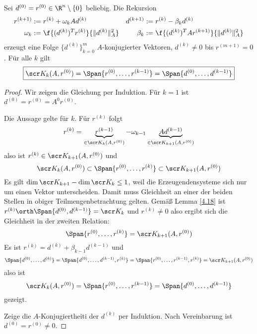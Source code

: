 \documentclass[11pt]{scrbook}
\begin{document}
\begin{st} \label{4.20}
	Sei $d^{(0)} = r^{(0)} \in \R^n \setminus \{0\}$ beliebig.
	Die Rekursion
	\begin{align*}
		r^{(k+1)} &:= r^{(k)} + \omega_k Ad^{(k)}
		& d^{(k+1)} &:= r^{(k)} - \beta_k d^{(k)} \\
		\omega_k &:= \f {(d^{(k)})^T r^{(k)}}{\|d^{(k)}\|_A^2}
		& \beta_k &:= \f{(d^{(k)})^T Ar^{(k+1)}}{\|d^{(k)}\|_A^2}
	\end{align*}
	erzeugt eine Folge $\{d^{(k)}\}_{k=0}^m$ $A$-konjugierter Vektoren, $d^{(k)} \neq 0$ bis $r^{(m+1)} = 0$.
	Für alle $k$ gilt
	\[
		\boxed{
			\scr K_k(A, r^{(0)}) = \Span\{r^{(0)}, \dotsc, r^{(k-1)}\} = \Span \{d^{(0)}, \dotsc, d^{(k-1)} \}
		}
	\]
	\begin{proof}
		Wir zeigen die Gleichung per Induktion.
		Für $k=1$ ist $d^{(0)} = r^{(0)} = A^0r^{(0)}$.

		Die Aussage gelte für $k$. Für $r^{(k)}$ folgt
		\[
			r^{(k)} = \underbrace{r^{(k-1)}}_{\in \scr K_k(A, r^{(0)})} - \omega_{k-1} \underbrace{A d^{(k-1)}}_{\in \scr K_{k+1}(A, r^{(0)})}
		\]
		also ist $r^{(k)} \in \scr K_{k+1}(A, r^{(0)})$ und
		\[
			\scr K_k(A, r^{(0)}) \subset \Span\{r^{(0)}, \dotsc, r^{(k)}\} \subset \scr K_{k+1}(A, r^{(0)})
		\]
		Es gilt $\dim \scr K_{k+1} - \dim \scr K_k \le 1$, weil die Erzeugendensysteme sich nur um einen Vektor unterscheiden.
		Damit muss Gleichheit an einer der beiden Stellen in obiger Teilmengenbetrachtung gelten.
		Gemäß Lemma \ref{4.18} ist $r^{(k)} \orth \Span\{d^{(0)}, d^{(k-1)}\} = \scr K_k$ und $r^{(k)} \neq 0$ also ergibt sich die Gleichheit in der zweiten Relation:
		\[
			\Span\{r^{(0)}, \dotsc, r^{(k)}\} = \scr K_{k+1} (A,r^{(0)})
		\]
		Es ist $r^{(k)} = d^{(k)} + \beta_{k-1} d^{(k-1)}$ und 
		\[
			\Span\{d^{(0)}, \dotsc, d^{(k)}\} 
			= \Span\{d^{(0)}, \dotsc, d^{(k-1)}, r^{(k)}\} 
			= \Span\{r^{(0)}, \dotsc, r^{(k-1)}, r^{(k)}\}
			= \scr K_{k+1} (A, r^{(0)})
		\]
		also ist 
		\[
			\scr K_k(A, r^{(0)}) = \Span\{r^{(0)}, \dotsc, r^{(k-1)}\} = \Span \{d^{(0)}, \dotsc, d^{(k-1)} \}
		\]
		gezeigt.

		Zeige die $A$-Konjugiertheiti der $d^{(k)}$ per Induktion.
		Nach Vereinbarung ist $d^{(0)} = r^{(0)} \neq 0$.


\end{proof}
\end{st}
\end{document}
